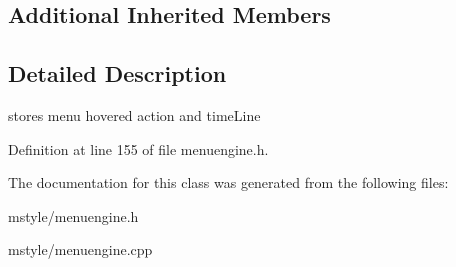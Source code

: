 \subsection*{Additional Inherited Members}


\subsection{Detailed Description}
stores menu hovered action and time\+Line 

Definition at line 155 of file menuengine.\+h.



The documentation for this class was generated from the following files\+:\begin{DoxyCompactItemize}
\item 
mstyle/menuengine.\+h\item 
mstyle/menuengine.\+cpp\end{DoxyCompactItemize}
